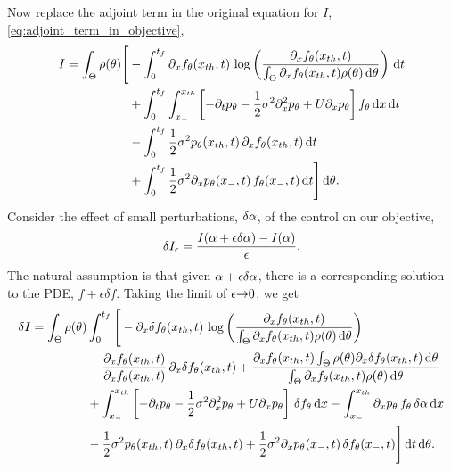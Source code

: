 \documentclass{article}
\def \tf {{t_f}}
\begin{document}
Now replace the adjoint term in the original equation for $I$,
\cref{eq:adjoint_term_in_objective},
\begin{align*}
I=  
\int_\Theta  \rho(\th) \Bigg[ 
&-\int_0^{\tf} 
	  \di_xf_\th(\xth, t)  \, 
		\log \left( \frac{\di_xf_\th(\xth, t)}
						{\int_\Theta \di_xf_\th(\xth, t)\rho(\th)\intd{\th} } \right)
\intd{t} 
\\ &+
\int_0^{\tf}\int_{x_-}^{\xth} 
	\left[-\di_tp_\th -  \frac{1 }{2}\s^2\di^2_xp_\th + U
          \di_xp_\th \right]  f_\th
\intd{x}\intd{t}
\\ 
&- \int_{0}^{\tf} \frac{1 }{2}\s^2 p_\th(\xth,t) \, \di_xf_\th(\xth,t) \intd{t}
\\
& + \int_{0}^{\tf} \frac{1 }{2}\s^2\di_xp_\th(x_-,t) \, f_\th(x_-,t) \intd{t}
\Bigg]				\intd{\th}	.   
\end{align*}
Consider the effect of small
perturbations, $\delta {\alpha}$, of the control on our objective, 
$$
\delta I_\epsilon =\frac{I({\alpha} + \epsilon \delta {\alpha}) - I({\alpha})}{{\epsilon}}.
$$
The natural assumption is that given ${\alpha} + \epsilon \delta {\alpha}$, there is a
corresponding solution to the PDE, $f+ \epsilon \delta f$. 
Taking the limit of $\epsilon{\rightarrow}0$, we get
\begin{equation}
\begin{aligned}
\delta I =  
\int_\Theta  \rho(\th) &\int_0^{\tf} \Bigg[ 
-   \di_x \delta f_\th(\xth, t)  \, 
		\log \left( \frac{\di_xf_\th(\xth, t)}
						{\int_\Theta \di_xf_\th(\xth, t)\rho(\th)\intd{\th} } \right)
\\ 
	&
-  \frac{ \di_x f_\th(\xth, t)}{ \di_x f_\th(\xth, t)}  \, \di_x
		\delta f_\th(\xth, t)
+    \frac{ \di_x f_\th(\xth, t) \int_\Theta \rho(\th) \di_x \delta f_\th(\xth, t) 	\intd{\th}	}{	{\int_\Theta \di_xf_\th(\xth,
	t)\rho(\th)\intd{\th} }} 		 			 
\\
 &+ \int_{x_-}^{\xth} 
	\left[-\di_tp_\th -  \frac{1 }{2}\s^2\di^2_xp_\th  + U \di_xp_\th \right]\,  \delta f_\th
\intd{x}
- \int_{x_-}^{\xth}
\di_xp_\th \, f_\th\, \delta \a \intd{x}
\\
 &-   \frac{1 }{2}\s^2 p_\th(\xth,t) \, \di_x\delta f_\th(\xth,t) 
+  \frac{1 }{2}\s^2\di_xp_\th(x_-,t) \, \delta f_\th(x_-,t)
  \Bigg]			 \intd{t}	\intd{\th}	.   
\end{aligned} 
\label{eq:differential_I_before_refactoring}
\end{equation}
\end{document}
